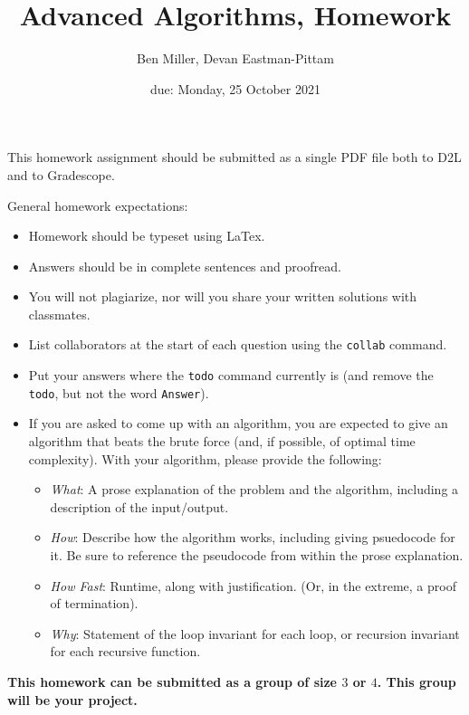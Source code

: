 \documentclass{article}
\title{Advanced Algorithms, Homework \hwnum}
\author{Ben Miller, Devan Eastman-Pittam}
\date{due: Monday, 25 October 2021}
\begin{document}
\maketitle

This homework assignment should be
submitted as a single PDF file both to D2L and to Gradescope.

General homework expectations:
\begin{itemize}
    \item Homework should be typeset using LaTex.
    \item Answers should be in complete sentences and proofread.
    \item You will not plagiarize, nor will you share your written solutions
        with classmates.
    \item List collaborators at the start of each question using the
        \texttt{collab} command.
    \item Put your answers where the \texttt{todo} command currently is (and
        remove the \texttt{todo}, but not the word \texttt{Answer}).
    \item If you are asked to come up with an algorithm, you are
        expected to give an algorithm that beats the brute force (and, if possible, of
        optimal time complexity). With your algorithm, please provide the following:
        \begin{itemize}
            \item \emph{What}: A prose explanation of the problem and the algorithm,
                including a description of the input/output.
            \item \emph{How}: Describe how the algorithm works, including giving
                psuedocode for it.  Be sure to reference the pseudocode
                from within the prose explanation.
            \item \emph{How Fast}: Runtime, along with justification.  (Or, in the
                extreme, a proof of termination).
            \item \emph{Why}: Statement of the loop invariant for each loop, or
                recursion invariant for each recursive function.
        \end{itemize}
\end{itemize}

{\bf
This homework can be submitted as a group of size $3$ or $4$.  This group will
be your project.
}

\end{document}
